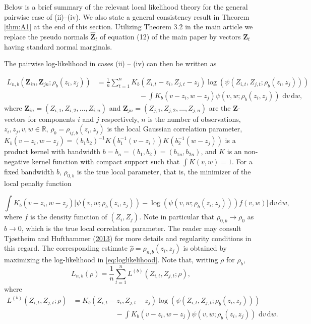 \documentclass[
  12pt,
  letterpaper]{article}
\numberwithin{equation}{section}
\newcommand{\Z}{\bm{Z}}
\newcommand{\hfZ}{\widehat{\bm{Z}}}
\newcommand{\di}{\,\textrm{d}}
\begin{document}
Below is a brief summary of the relevant local likelihood theory for the general pairwise case of (ii)--(iv). We also state a general consistency result in Theorem \ref{thm:A1} at the end of this section. Utilizing Theorem 3.2 in the main article we replace the pseudo normals \(\hfZ_t\) of equation (12) of the main paper by vectors \(\Z_t\) having standard normal marginals.

The pairwise log-likelihood in cases (ii) -- (iv) can then be written as

\begin{align}
L_{n,b}(\Z_{in}, \Z_{jn}; \rho_b(z_i, z_j)) &= \frac{1}{n}\sum_{t=1}^n K_b(Z_{i,t} - z_i, Z_{j,t} - z_j)\log\left(\psi(Z_{i,t}, Z_{j,t}; \rho_b(z_i, z_j))\right) \nonumber \\  
& \qquad\qquad\qquad - \int K_b(v-z_i, w- z_j)\psi(v,w;\rho_b(z_i, z_j)) \, \di v \di w,
\label{eq:loglikelihood}
\end{align}
where \(\Z_{in} = (Z_{i,1}, Z_{i,2}, \ldots, Z_{i,n})\) and \(\Z_{jn} = (Z_{j,1}, Z_{j,2}, \ldots, Z_{j,n})\) are the \(\Z\)-vectors for components \(i\) and \(j\) respectively, \(n\) is the number of observations, \(z_i, z_j, v, w \in \mathbb{R}\), \(\rho_b = \rho_{ij,b}(z_i,z_j)\) is the local Gaussian correlation parameter, \(K_b(v-z_i, w-z_j) = (b_1b_2)^{-1}K(b_1^{-1}(v-z_i))K(b_2^{-1}(w-z_j))\) is a product kernel with bandwidth \(b=b_n=(b_1,b_2) = (b_{1n}, b_{2n})\), and \(K\) is an non-negative kernel function with compact support such that \(\int K(v,w) = 1\). For a fixed bandwidth \(b\), \(\rho_{0,b}\) is the true local parameter, that is, the minimizer of the local penalty function

\begin{equation}
\int K_b(v-z_i, w-z_j)\big[\psi(v,w; \rho_b(z_i, z_j)) - \log(\psi(v,w; \rho_b(z_i, z_j)))f(v,w)\big] \di v \di w,
\label{eq:penalty}
\end{equation}
where \(f\) is the density function of \((Z_i, Z_j)\). Note in particular that \(\rho_{0,b} \rightarrow \rho_0\) as \(b\rightarrow0\), which is the true local correlation parameter. The reader may consult Tjøstheim and Hufthammer (\protect\hyperlink{ref-tjostheim2013local}{2013}) for more details and regularity conditions in this regard. The corresponding estimate \(\widehat \rho = \rho_{n, b}(z_i,z_j)\) is obtained by maximizing the log-likelihood in \eqref{eq:loglikelihood}. Note that, writing \(\rho\) for \(\rho_b\),
\begin{equation}
L_{n,b}(\rho) = \frac{1}{n}\sum_{t=1}^n L^{(b)}(Z_{i,t}, Z_{j,t}; \rho),
\end{equation}
where
\begin{align}
L^{(b)}(Z_{i,t}, Z_{j,t}; \rho) &= K_b(Z_{i,t} - z_i, Z_{j,t} - z_j)\log\left(\psi(Z_{i,t}, Z_{j,t}; \rho_b(z_i, z_j))\right) \nonumber \\  
& \qquad\qquad\qquad - \int K_b(v-z_i, w- z_j)\psi(v,w;\rho_b(z_i, z_j)) \, \di v \di w.
\label{eq:A16}
\end{align}
\end{document}
